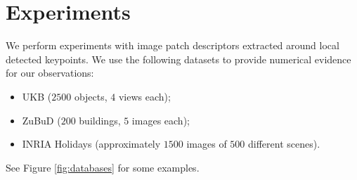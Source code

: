 \documentclass[10pt,conference,a4paper]{IEEEtran}
\begin{document}
	\section{Experiments}
		We perform experiments with image patch descriptors extracted around local detected keypoints.
		We use the following datasets to provide numerical evidence for our observations:
		\begin{itemize}
			\item
				UKB \cite{ukb} ($2500$ objects, $4$ views each);
			\item
				ZuBuD \cite{zubud} ($200$ buildings, $5$ images each);
			\item
				INRIA Holidays \cite{holidays}
				(approximately $1500$ images of $500$ different scenes).
		\end{itemize}
		See Figure \ref{fig:databases} for some examples.
\end{document}
